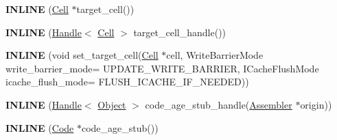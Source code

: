 \begin{DoxyCompactItemize}
\item 
{\bfseries I\+N\+L\+I\+NE} (\hyperlink{classv8_1_1internal_1_1_cell}{Cell} $\ast$target\+\_\+cell())\hypertarget{classv8_1_1internal_1_1_reloc_info_afd57c668730c2b872937041116bc1a47}{}\label{classv8_1_1internal_1_1_reloc_info_afd57c668730c2b872937041116bc1a47}

\item 
{\bfseries I\+N\+L\+I\+NE} (\hyperlink{classv8_1_1internal_1_1_handle}{Handle}$<$ \hyperlink{classv8_1_1internal_1_1_cell}{Cell} $>$ target\+\_\+cell\+\_\+handle())\hypertarget{classv8_1_1internal_1_1_reloc_info_a53a2b792883dc89d8c83cfc7daf2b54e}{}\label{classv8_1_1internal_1_1_reloc_info_a53a2b792883dc89d8c83cfc7daf2b54e}

\item 
{\bfseries I\+N\+L\+I\+NE} (void set\+\_\+target\+\_\+cell(\hyperlink{classv8_1_1internal_1_1_cell}{Cell} $\ast$cell,                                                                                                               Write\+Barrier\+Mode write\+\_\+barrier\+\_\+mode=                                                                                                                               U\+P\+D\+A\+T\+E\+\_\+\+W\+R\+I\+T\+E\+\_\+\+B\+A\+R\+R\+I\+ER,                                                                                                               I\+Cache\+Flush\+Mode icache\+\_\+flush\+\_\+mode=                                                                                                                               F\+L\+U\+S\+H\+\_\+\+I\+C\+A\+C\+H\+E\+\_\+\+I\+F\+\_\+\+N\+E\+E\+D\+ED))\hypertarget{classv8_1_1internal_1_1_reloc_info_aacfcbf96f1b7df8dfa823246fd99da0c}{}\label{classv8_1_1internal_1_1_reloc_info_aacfcbf96f1b7df8dfa823246fd99da0c}

\item 
{\bfseries I\+N\+L\+I\+NE} (\hyperlink{classv8_1_1internal_1_1_handle}{Handle}$<$ \hyperlink{classv8_1_1internal_1_1_object}{Object} $>$ code\+\_\+age\+\_\+stub\+\_\+handle(\hyperlink{classv8_1_1internal_1_1_assembler}{Assembler} $\ast$origin))\hypertarget{classv8_1_1internal_1_1_reloc_info_a8d7e195c31afc9400cec9025bee47355}{}\label{classv8_1_1internal_1_1_reloc_info_a8d7e195c31afc9400cec9025bee47355}

\item 
{\bfseries I\+N\+L\+I\+NE} (\hyperlink{classv8_1_1internal_1_1_code}{Code} $\ast$code\+\_\+age\+\_\+stub())\hypertarget{classv8_1_1internal_1_1_reloc_info_a3d0f27312c882a24cc408009fb809608}{}\label{classv8_1_1internal_1_1_reloc_info_a3d0f27312c882a24cc408009fb809608}


\end{DoxyCompactItemize}
